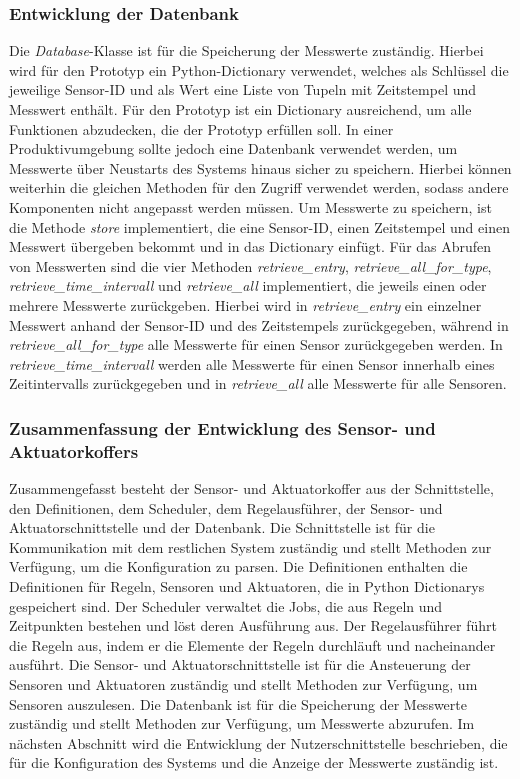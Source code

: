 \subsubsection{Entwicklung der Datenbank}
Die \emph{Database}-Klasse ist für die Speicherung der Messwerte zuständig.
Hierbei wird für den Prototyp ein Python-Dictionary verwendet, welches als Schlüssel die jeweilige Sensor-ID und als Wert eine Liste von Tupeln mit Zeitstempel und Messwert enthält.
Für den Prototyp ist ein Dictionary ausreichend, um alle Funktionen abzudecken, die der Prototyp erfüllen soll.
In einer Produktivumgebung sollte jedoch eine Datenbank verwendet werden, um Messwerte über Neustarts des Systems hinaus sicher zu speichern.
Hierbei können weiterhin die gleichen Methoden für den Zugriff verwendet werden, sodass andere Komponenten nicht angepasst werden müssen.
Um Messwerte zu speichern, ist die Methode \emph{store} implementiert, die eine Sensor-ID, einen Zeitstempel und einen Messwert übergeben bekommt und in das Dictionary einfügt.
Für das Abrufen von Messwerten sind die vier Methoden \emph{retrieve\_entry}, \emph{retrieve\_all\_for\_type}, \emph{retrieve\_time\_intervall} und \emph{retrieve\_all} implementiert, die jeweils einen oder mehrere Messwerte zurückgeben.
Hierbei wird in \emph{retrieve\_entry} ein einzelner Messwert anhand der Sensor-ID und des Zeitstempels zurückgegeben, während in \emph{retrieve\_all\_for\_type} alle Messwerte für einen Sensor zurückgegeben werden.
In \emph{retrieve\_time\_intervall} werden alle Messwerte für einen Sensor innerhalb eines Zeitintervalls zurückgegeben und in \emph{retrieve\_all} alle Messwerte für alle Sensoren.

\subsubsection{Zusammenfassung der Entwicklung des Sensor- und Aktuatorkoffers}
Zusammengefasst besteht der Sensor- und Aktuatorkoffer aus der Schnittstelle, den Definitionen, dem Scheduler, dem Regelausführer, der Sensor- und Aktuatorschnittstelle und der Datenbank.
Die Schnittstelle ist für die Kommunikation mit dem restlichen System zuständig und stellt Methoden zur Verfügung, um die Konfiguration zu parsen.
Die Definitionen enthalten die Definitionen für Regeln, Sensoren und Aktuatoren, die in Python Dictionarys gespeichert sind.
Der Scheduler verwaltet die Jobs, die aus Regeln und Zeitpunkten bestehen und löst deren Ausführung aus.
Der Regelausführer führt die Regeln aus, indem er die Elemente der Regeln durchläuft und nacheinander ausführt.
Die Sensor- und Aktuatorschnittstelle ist für die Ansteuerung der Sensoren und Aktuatoren zuständig und stellt Methoden zur Verfügung, um Sensoren auszulesen.
Die Datenbank ist für die Speicherung der Messwerte zuständig und stellt Methoden zur Verfügung, um Messwerte abzurufen.
Im nächsten Abschnitt wird die Entwicklung der Nutzerschnittstelle beschrieben, die für die Konfiguration des Systems und die Anzeige der Messwerte zuständig ist.


